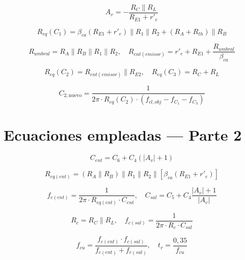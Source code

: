 \documentclass[journal]{IEEEtran}
\begin{document}
\begin{equation*}
    A_v = -\frac{R_C\|R_L}{R_{E1} + r'_e}
\end{equation*}

\begin{equation*}
    R_{eq}(C_1) = \beta_{ca}(R_{E1} + r'_e)\|R_1\|R_2 + (R_A + R_{th})\|R_B
\end{equation*}

\begin{equation*}
    R_{umbral} = R_A\|R_B\|R_1\|R_2, \quad
    R_{ent(emisor)} = r'_e + R_{E1} + \frac{R_{umbral}}{\beta_{ca}}
\end{equation*}

\begin{equation*}
    R_{eq}(C_2) = R_{ent(emisor)}\|R_{E2}, \quad
    R_{eq}(C_3) = R_C + R_L
\end{equation*}

\begin{equation*}
    C_{2,\text{nuevo}} = \frac{1}{2\pi \cdot R_{eq}(C_2) \cdot (f_{cl,obj} - f_{C_1} - f_{C_3})}
\end{equation*}


\section{Ecuaciones empleadas --- Parte 2}
\label{apx:ec_p2}

\begin{equation*}
    C_{ent} = C_6 + C_4(|A_v| + 1)
\end{equation*}

\begin{equation*}
    R_{eq(ent)} = (R_A\|R_B)\|R_1\|R_2\|[\beta_{ca}(R_{E1} + r'_e)]
\end{equation*}

\begin{equation*}
    f_{c(ent)} = \frac{1}{2\pi \cdot R_{eq(ent)} \cdot C_{ent}}, \quad
    C_{sal} = C_5 + C_4\frac{|A_v|+1}{|A_v|}
\end{equation*}

\begin{equation*}
    R_c = R_C\|R_L, \quad
    f_{c(sal)} = \frac{1}{2\pi \cdot R_c \cdot C_{sal}}
\end{equation*}

\begin{equation*}
    f_{cu} = \frac{f_{c(ent)} \cdot f_{c(sal)}}{f_{c(ent)} + f_{c(sal)}}, \quad
    t_r = \frac{0{,}35}{f_{cu}}
\end{equation*}
\end{document}
